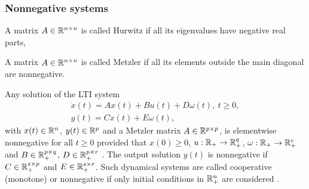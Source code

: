 \subsubsection{Nonnegative systems}

\begin{definition}[Hurwitz]
	\begin{leftbar}[defnbar]
		A matrix $A\in\mathbb{R}^{n\times n}$ is called {Hurwitz} if all its eigenvalues have negative real parts, 
	\end{leftbar}
\end{definition}
\begin{definition}[Metzler]
	\begin{leftbar}[defnbar]
		A matrix $A\in\mathbb{R}^{n\times n}$ is called {Metzler} if all its elements outside the main diagonal are nonnegative.
	\end{leftbar}
\end{definition}

Any solution of the \gls{LTI} system
\begin{gather}
\dot{x}(t)=Ax(t)+Bu(t)+ D\omega(t),\:t\geq0,\label{eq:LTI_syst}\\
y(t)=Cx(t)+E\omega(t),\nonumber 
\end{gather}
with $x(t)\in\mathbb{R}^{n}$, $y(t)\in\mathbb{R}^{p}$ and a Metzler matrix $A\in\mathbb{R}^{p\times p}$, is elementwise nonnegative for all $t\ge0$ provided that $x(0)\ge0$, $u:\mathbb{R}_{+}\to\mathbb{R}_{+}^{q}$, $\omega:\mathbb{R}_{+}\to\mathbb{R}_{+}^{r}$ and $B\in\mathbb{R}_{+}^{p\times q}$, $D\in\mathbb{R}_{+}^{p\times r}$ \citep{FarinaRinaldi2000,Smith95}. The output solution $y(t)$ is nonnegative if $C\in\mathbb{R}_{+}^{s\times p}$ and $E\in\mathbb{R}_{+}^{s\times r}$. Such dynamical systems are called cooperative (monotone) or nonnegative if only initial conditions in $\mathbb{R}_{+}^{n}$ are considered \citep{FarinaRinaldi2000,Smith95}.


